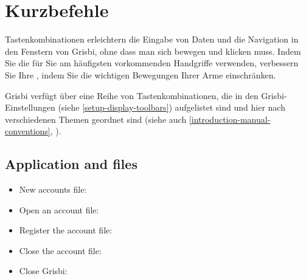 \section{Kurzbefehle\label{home-shortcuts}}

Tastenkombinationen erleichtern die Eingabe von Daten und die Navigation in den Fenstern von Grisbi, ohne dass man sich bewegen und klicken muss. Indem Sie die für Sie am häufigsten vorkommenden Handgriffe verwenden, verbessern Sie Ihre , indem Sie die wichtigen Bewegungen Ihrer Arme einschränken.
 
Grisbi verfügt über eine Reihe von Tastenkombinationen, die in den Grisbi-Einstellungen (siehe \vref{setup-display-toolbars}) aufgelistet sind und hier nach verschiedenen Themen geordnet sind (siehe auch \vref{introduction-manual-conventions}, ).

\subsection{Application and files}

\begin{itemize}
	\item New accounts file: 
	\item Open an account file: 
	\item Register the account file: 
	\item Close the account file: 
	\item Close Grisbi: 
\end{itemize}


